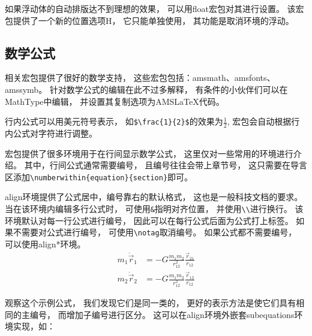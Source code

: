 \documentclass[UTF8]{ctexart}
\numberwithin{equation}{section}			%
\begin{document}
    如果浮动体的自动排版达不到理想的效果，
    可以用float宏包对其进行设置。
    该宏包提供了一个新的位置选项H，
    它只能单独使用，
    其功能是取消环境的浮动。
    
    \subsection{数学公式}
    \AmS 相关宏包提供了很好的数学支持，
    这些宏包包括：amsmath、amsfonts、amssymb。
    针对数学公式的编辑在此不过多解释，
    有条件的小伙伴们可以在MathType中编辑，
    并设置其复制选项为AMSLaTeX代码。
    
    行内公式可以用美元符号表示，
    如\verb|$\frac{1}{2}$|的效果为$\frac{1}{2}$,
    \AmS 宏包会自动根据行内公式对字符进行调整。
    
    \AmS 宏包提供了很多环境用于在行间显示数学公式，
    这里仅对一些常用的环境进行介绍。
    其中，行间公式通常需要编号，
    且编号往往会带上章节号，
    这只需要在导言区添加\verb|\numberwithin{equation}{section}|即可。
    
    align环境提供了公式居中，编号靠右的默认格式，
    这也是一般科技文档的要求。
    当在该环境内编辑多行公式时，
    可使用\verb|&|指明对齐位置，
    并使用\verb|\\|进行换行。
    该环境默认对每一行公式进行编号，
    因此可以在每行公式后面为公式打上标签。
    如果不需要对公式进行编号，
    可使用\verb|\notag|取消编号。
    如果公式都不需要编号，
    可以使用align*环境。
    \begin{align}
        {m_1}{{\ddot \vec r}_1} &=  
            -G\frac{{{m_1}{m_2}}}{{r_{12}^2}}\frac{{{{\vec r}_{21}}}}
            {{{r_{12}}}} 	\label{eq:r1}  \\
        {m_2}{{\ddot \vec r}_2} &=  
            - G\frac{{{m_1}{m_2}}}{{r_{12}^2}}\frac{{{{\vec r}_{12}}}}
            {{{r_{12}}}} 	\label{eq:r2}
    \end{align}
    
    观察这个示例公式，
    我们发现它们是同一类的，
    更好的表示方法是使它们具有相同的主编号，
    而增加子编号进行区分。
    这可以在align环境外嵌套subequations环境实现，如：
    
\end{document}
